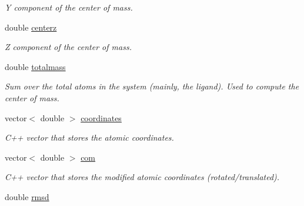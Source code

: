 \begin{DoxyCompactItemize}
\begin{DoxyCompactList}\small\item\em Y component of the center of mass. \item\end{DoxyCompactList}\item 
\hypertarget{classCOORD__MC_aa1460a53a8d28f0b996b5fa2cbf380bb}{
double \hyperlink{classCOORD__MC_aa1460a53a8d28f0b996b5fa2cbf380bb}{centerz}}
\label{classCOORD__MC_aa1460a53a8d28f0b996b5fa2cbf380bb}

\begin{DoxyCompactList}\small\item\em Z component of the center of mass. \item\end{DoxyCompactList}\item 
\hypertarget{classCOORD__MC_a70416fcf15164c93c2620dcec369168e}{
double \hyperlink{classCOORD__MC_a70416fcf15164c93c2620dcec369168e}{totalmass}}
\label{classCOORD__MC_a70416fcf15164c93c2620dcec369168e}

\begin{DoxyCompactList}\small\item\em Sum over the total atoms in the system (mainly, the ligand). Used to compute the center of mass. \item\end{DoxyCompactList}\item 
\hypertarget{classCOORD__MC_ad57a46a39d0a10f664128225e24bf99f}{
vector$<$ double $>$ \hyperlink{classCOORD__MC_ad57a46a39d0a10f664128225e24bf99f}{coordinates}}
\label{classCOORD__MC_ad57a46a39d0a10f664128225e24bf99f}

\begin{DoxyCompactList}\small\item\em C++ vector that stores the atomic coordinates. \item\end{DoxyCompactList}\item 
vector$<$ double $>$ \hyperlink{classCOORD__MC_adf957d739f01ee5eb6fa85cbbb106c18}{com}
\begin{DoxyCompactList}\small\item\em C++ vector that stores the modified atomic coordinates (rotated/translated). \item\end{DoxyCompactList}\item 
\hypertarget{classCOORD__MC_a3c3862298348e0550aa384e3e21b4e5f}{
double \hyperlink{classCOORD__MC_a3c3862298348e0550aa384e3e21b4e5f}{rmsd}}
\label{classCOORD__MC_a3c3862298348e0550aa384e3e21b4e5f}


\end{DoxyCompactItemize}
